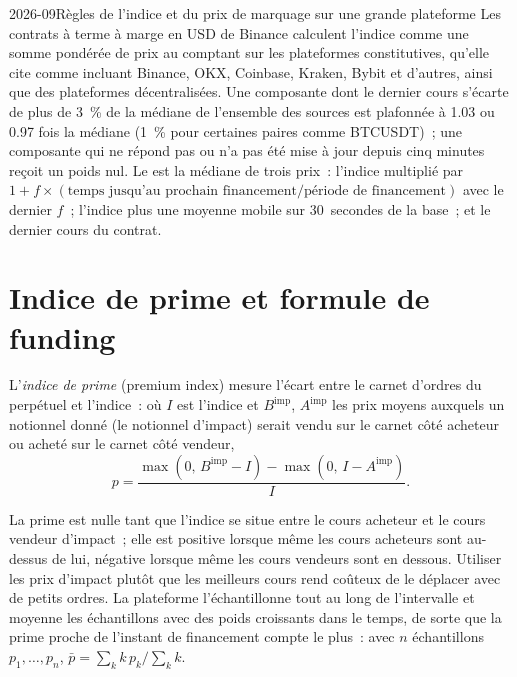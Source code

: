 \begin{dated}{2026-09}{Règles de l'indice et du prix de marquage sur une grande plateforme}\label{dat:m3:perpetual-futures:mark}
Les contrats à terme à marge en USD de Binance calculent l'indice comme une somme pondérée de prix au comptant
sur les plateformes constitutives, qu'elle cite comme incluant Binance, OKX, Coinbase, Kraken, Bybit et d'autres,
ainsi que des plateformes décentralisées. Une composante dont le dernier cours s'écarte de plus de 3~\% de la médiane de
l'ensemble des sources est plafonnée à 1.03 ou 0.97 fois la médiane (1~\% pour certaines paires comme BTCUSDT)~; une composante qui
ne répond pas ou n'a pas été mise à jour depuis cinq minutes reçoit un poids nul. Le  est la médiane de trois
prix~: l'indice multiplié par $1 + f \times (\text{temps jusqu'au prochain financement}/\text{période de financement})$ avec le dernier
 $f$~; l'indice plus une moyenne mobile sur 30~secondes de la base~; et le dernier cours du contrat.
\end{dated}

\section{Indice de prime et formule de funding}

\begin{definition}\label{def:m3:perpetual-futures:premium}
L'\emph{indice de prime} (premium index) mesure l'écart entre le carnet d'ordres du perpétuel et l'indice~:
où $I$ est l'indice et $B^{\mathrm{imp}}$, $A^{\mathrm{imp}}$ les prix moyens auxquels un notionnel donné
(le notionnel d'impact) serait vendu sur le carnet côté acheteur ou acheté sur le carnet côté vendeur,
\[
p = \frac{\max(0,\, B^{\mathrm{imp}} - I) - \max(0,\, I - A^{\mathrm{imp}})}{I}.
\]
\end{definition}

La prime est nulle tant que l'indice se situe entre le cours acheteur et le cours vendeur d'impact~; elle est positive lorsque même les
cours acheteurs sont au-dessus de lui, négative lorsque même les cours vendeurs sont en dessous. Utiliser les prix d'impact plutôt que les meilleurs cours rend
coûteux de le déplacer avec de petits ordres. La plateforme l'échantillonne tout au long de l'intervalle et moyenne les échantillons avec des poids
croissants dans le temps, de sorte que la prime proche de l'instant de financement compte le plus~: avec $n$ échantillons $p_1,\dots,p_n$,
$\bar p = \sum_k k\,p_k \big/ \sum_k k$.

